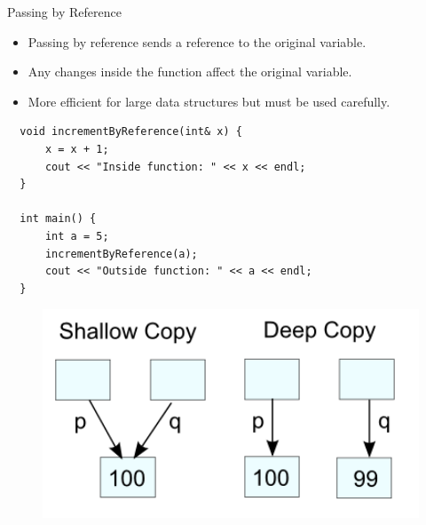 \documentclass[10pt]{beamer}
\begin{document}
\begin{frame}[fragile]{Passing by Reference}
  \begin{itemize}
    \item Passing by reference sends a reference to the original variable.
    \item Any changes inside the function affect the original variable.
    \item More efficient for large data structures but must be used carefully.
  \end{itemize}
  
  \begin{lstlisting}
  void incrementByReference(int& x) {
      x = x + 1;
      cout << "Inside function: " << x << endl;
  }
  
  int main() {
      int a = 5;
      incrementByReference(a);
      cout << "Outside function: " << a << endl;
  }
  \end{lstlisting}
\end{frame}

\begin{frame}
  \begin{figure}[h]
    \centering
    \includegraphics[width=1.0\textwidth]{figures/deep_vs_shallow_copy.png}
    \label{fig:MemoryHerarchy}
  \end{figure}
\end{frame}
\end{document}
